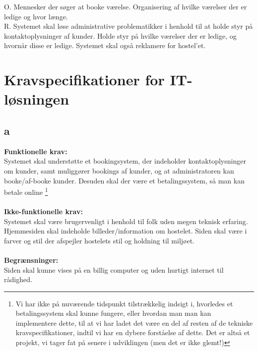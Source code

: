 \documentclass[12pt,a4paper]{article}
\begin{document}
O. Mennesker der søger at booke værelse. Organisering af hvilke værelser der er ledige og hvor længe.\\

R. Systemet skal løse administrative problematikker i henhold til at holde styr på kontaktoplysninger af kunder. Holde styr på hvilke værelser der er ledige, og hvornår disse er ledige. Systemet skal også reklamere for hostel'et.\\
\newpage
\section{Kravspecifikationer for IT-løsningen}
\subsection{a}
\textbf{Funktionelle krav:} \\
	Systemet skal understøtte et bookingsystem, der indeholder kontaktoplysninger om kunder, 	samt muliggører bookings af kunder, og at administratoren kan booke/af-booke kunder. Desuden skal der være et betalingssystem, så man kan betale online \footnote{Vi har ikke på nuværende tidspunkt tilstrækkelig indsigt i, hvorledes et betalingssystem skal kunne fungere, eller hvordan man man kan implementere dette, til at vi har ladet det være en del af resten af de tekniske kravspecifikationer, indtil vi har en dybere forståelse af dette. Det er altså et projekt, vi tager fat på senere i udviklingen (men det er ikke glemt!)  } \\ \hfill \\
       \textbf{Ikke-funktionelle krav:} \\
	Systemet skal være brugervenligt i henhold til folk uden megen teknisk erfaring. 	Hjemmesiden skal indeholde billeder/information om hostelet. Siden skal være i farver og 	stil der afspejler hostelets stil og holdning til miljøet. \\ \hfill \\
      \textbf{Begrænsninger:} \\
	Siden skal kunne vises på en billig computer og uden hurtigt internet til rådighed.
\end{document}

